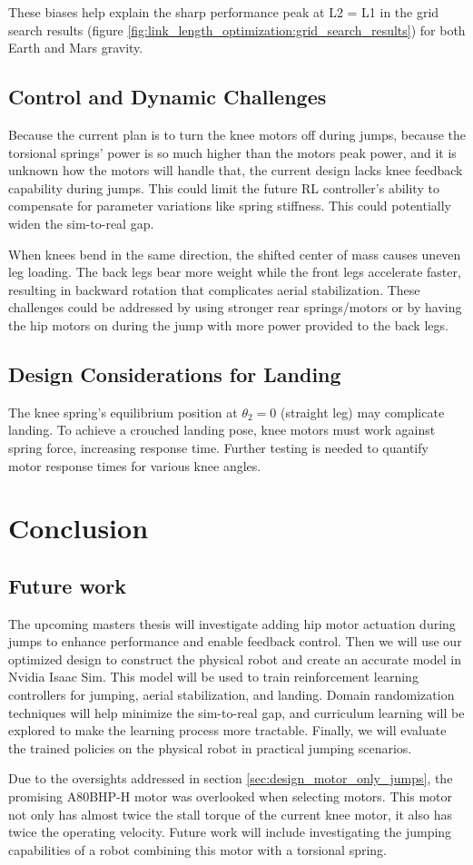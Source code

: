 These biases help explain the sharp performance peak at L2 = L1 in the grid search results (figure \ref{fig:link_length_optimization:grid_search_results}) for both Earth and Mars gravity.

\subsection{Control and Dynamic Challenges}
Because the current plan is to turn the knee motors off during jumps, because the torsional springs' power is so much higher than the motors peak power, and it is unknown how the motors will handle that, the current design lacks knee feedback capability during jumps. This could limit the future RL controller's ability to compensate for parameter variations like spring stiffness. This could potentially widen the sim-to-real gap.

When knees bend in the same direction, the shifted center of mass causes uneven leg loading. The back legs bear more weight while the front legs accelerate faster, resulting in backward rotation that complicates aerial stabilization. These challenges could be addressed by using stronger rear springs/motors or by having the hip motors on during the jump with more power provided to the back legs.

\subsection{Design Considerations for Landing}
The knee spring's equilibrium position at $\theta_2=0$ (straight leg) may complicate landing. To achieve a crouched landing pose, knee motors must work against spring force, increasing response time. Further testing is needed to quantify motor response times for various knee angles.

\section{Conclusion}


\subsection{Future work}
\label{sec:future_work}
The upcoming masters thesis will investigate adding hip motor actuation during jumps to enhance performance and enable feedback control. Then we will use our optimized design to construct the physical robot and create an accurate model in Nvidia Isaac Sim. This model will be used to train reinforcement learning controllers for jumping, aerial stabilization, and landing. Domain randomization techniques will help minimize the sim-to-real gap, and curriculum learning will be explored to make the learning process more tractable. Finally, we will evaluate the trained policies on the physical robot in practical jumping scenarios.

Due to the oversights addressed in section \ref{sec:design_motor_only_jumps}, the promising A80BHP-H motor was overlooked when selecting motors. This motor not only has almost twice the stall torque of the current knee motor, it also has twice the operating velocity. Future work will include investigating the jumping capabilities of a robot combining this motor with a torsional spring.
